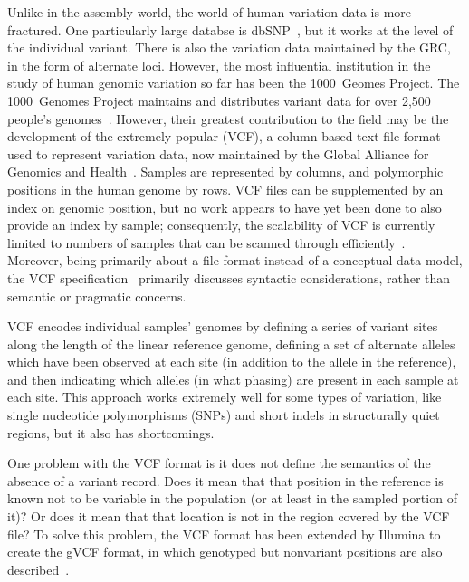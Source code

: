 Unlike in the assembly world, the world of human variation data is more fractured. One particularly large databse is dbSNP~\cite{sherry2001dbsnp}, but it works at the level of the individual variant. There is also the variation data maintained by the GRC, in the form of alternate loci. However, the most influential institution in the study of human genomic variation so far has been the 1000~Geomes Project. The 1000~Genomes Project maintains and distributes variant data for over 2,500 people's genomes~\cite{sudmant2015integrated}. However, their greatest contribution to the field may be the development of the extremely popular  (VCF), a column-based text file format used to represent variation data, now maintained by the Global Alliance for Genomics and Health~\cite{danecek2011variant}. Samples are represented by columns, and polymorphic positions in the human genome by rows. VCF files can be supplemented by an index on genomic position, but no work appears to have yet been done to also provide an index by sample; consequently, the scalability of VCF is currently limited to numbers of samples that can be scanned through efficiently~\cite{danecek2011variant}. Moreover, being primarily about a file format instead of a conceptual data model, the VCF specification~\cite{marshall2013variant} primarily discusses syntactic considerations, rather than semantic or pragmatic concerns.

VCF encodes individual samples' genomes by defining a series of variant sites along the length of the linear reference genome, defining a set of alternate alleles which have been observed at each site (in addition to the allele in the reference), and then indicating which alleles (in what phasing) are present in each sample at each site. This approach works extremely well for some types of variation, like single nucleotide polymorphisms (SNPs) and short indels in structurally quiet regions, but it also has shortcomings.

One problem with the VCF format is it does not define the semantics of the absence of a variant record. Does it mean that that position in the reference is known not to be variable in the population (or at least in the sampled portion of it)? Or does it mean that that location is not in the region covered by the VCF file? To solve this problem, the VCF format has been extended by Illumina to create the gVCF format, in which genotyped but nonvariant positions are also described~\cite{saunders2014about}.

